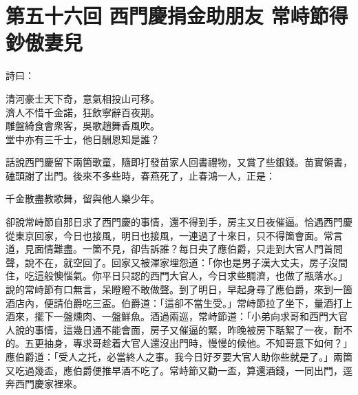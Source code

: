 
\chapter*{第五十六回 西門慶捐金助朋友 常峙節得鈔傲妻兒}


詩曰：

\begin{myquote}
清河豪士天下奇，意氣相投山可移。\\濟人不惜千金諾，狂飲寧辭百夜期。\\雕盤綺食會衆客，吳歌趙舞香風吹。\\堂中亦有三千士，他日酬恩知是誰？
\end{myquote}

話說西門慶留下兩箇歌童，隨即打發苗家人回書禮物，又賞了些銀錢。苗實領書，磕頭謝了出門。後來不多些時，春燕死了，止春鴻一人，正是：

\begin{myquote}
千金散盡教歌舞，留與他人樂少年。
\end{myquote}

卻說常峙節自那日求了西門慶的事情，還不得到手，房主又日夜催逼。恰遇西門慶從東京回家，今日也接風，明日也接風，一連過了十來日，只不得箇會面。常言道，見面情難盡。一箇不見，卻告訴誰？每日央了應伯爵，只走到大官人門首問聲，說不在，就空回了。{}回家又被渾家埋怨道：「你也是男子漢大丈夫，房子沒間住，吃這般懊惱氣。你平日只認的西門大官人，今日求些賙濟，也做了瓶落水。」說的常峙節有口無言，呆瞪瞪不敢做聲。{}到了明日，早起身尋了應伯爵，來到一箇酒店內，便請伯爵吃三盃。{}伯爵道：「這卻不當生受。」常峙節拉了坐下，量酒打上酒來，擺下一盤燻肉、一盤鮮魚。酒過兩巡，常峙節道：「小弟向求哥和西門大官人說的事情，這幾日通不能會面，房子又催逼的緊，昨晚被房下聒絮了一夜，耐不的。五更抽身，專求哥趁着大官人還沒出門時，慢慢的候他。{}不知哥意下如何？」應伯爵道：「受人之托，必當終人之事。我今日好歹要大官人助你些就是了。」兩箇又吃過幾盃，應伯爵便推早酒不吃了。常峙節又勸一盃，算還酒錢，一同出門，逕奔西門慶家裡來。

